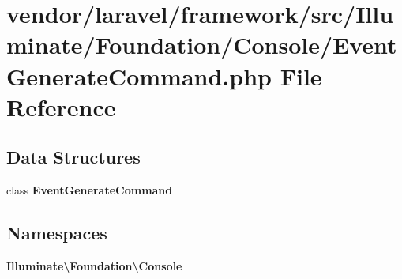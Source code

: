 \section{vendor/laravel/framework/src/\+Illuminate/\+Foundation/\+Console/\+Event\+Generate\+Command.php File Reference}
\label{_event_generate_command_8php}
\subsection*{Data Structures}
\begin{DoxyCompactItemize}
\item 
class {\bf Event\+Generate\+Command}
\end{DoxyCompactItemize}
\subsection*{Namespaces}
\begin{DoxyCompactItemize}
\item 
 {\bf Illuminate\textbackslash{}\+Foundation\textbackslash{}\+Console}
\end{DoxyCompactItemize}
